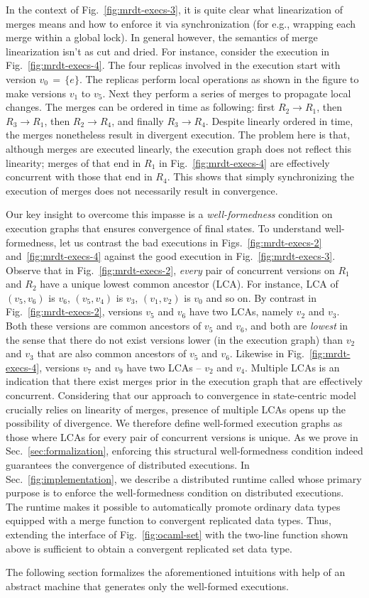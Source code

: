 In the context of Fig.~\ref{fig:mrdt-execs-3}, it is quite clear what
linearization of merges means and how to enforce it via
synchronization (for e.g., wrapping each merge within a global lock).
In general however, the semantics of merge linearization isn't as cut
and dried. For instance, consider the execution in
Fig.~\ref{fig:mrdt-execs-4}. The four replicas involved in the
execution start with version $v_0 \,=\, \{e\}$. The replicas perform
local operations as shown in the figure to make versions $v_1$ to
$v_5$. Next they perform a series of merges to propagate local
changes. The merges can be ordered in time as following: first $R_2
\rightarrow R_1$, then $R_3 \rightarrow R_1$, then $R_2 \rightarrow
R_4$, and finally $R_3 \rightarrow R_4$. Despite linearly ordered in
time, the merges nonetheless result in divergent execution. The
problem here is that, although merges are executed linearly, the
execution graph does not reflect this linearity; merges of that end in
$R_1$ in Fig.~\ref{fig:mrdt-execs-4} are effectively concurrent with
those that end in $R_4$. This shows that simply synchronizing the
execution of merges does not necessarily result in convergence.

Our key insight to overcome this impasse is a \emph{well-formedness}
condition on execution graphs that ensures convergence of final
states. To understand well-formedness, let us contrast the bad
executions in Figs.~\ref{fig:mrdt-execs-2} and~\ref{fig:mrdt-execs-4}
against the good execution in Fig.~\ref{fig:mrdt-execs-3}. Observe
that in Fig.~\ref{fig:mrdt-execs-2}, \emph{every} pair of concurrent
versions on $R_1$ and $R_2$ have a unique lowest common ancestor
(LCA). For instance, LCA of $(v_5,v_6)$ is $v_6$, $(v_5,v_4)$ is
$v_3$, $(v_1,v_2)$ is $v_0$ and so on. By contrast in
Fig.~\ref{fig:mrdt-execs-2}, versions $v_5$ and $v_6$ have two LCAs,
namely $v_2$ and $v_3$. Both these versions are common ancestors of
$v_5$ and $v_6$, and both are \emph{lowest} in the sense that there do
not exist versions lower (in the execution graph) than $v_2$ and $v_3$
that are also common ancestors of $v_5$ and $v_6$. Likewise in
Fig.~\ref{fig:mrdt-execs-4}, versions $v_7$ and $v_9$ have two LCAs --
$v_2$ and $v_4$. Multiple LCAs is an indication that there exist
merges prior in the execution graph that are effectively concurrent.
Considering that our approach to convergence in state-centric model
crucially relies on linearity of merges, presence of multiple LCAs
opens up the possibility of divergence. We therefore define
well-formed execution graphs as those where LCAs for every pair of
concurrent versions is unique. As we prove in
Sec.~\ref{sec:formalization}, enforcing this structural
well-formedness condition indeed guarantees the convergence of
distributed executions. In Sec.~\ref{fig:implementation}, we describe
a distributed runtime called \quark whose primary purpose is to
enforce the well-formedness condition on distributed executions. The
runtime makes it possible to automatically promote ordinary data types
equipped with a merge function to convergent replicated data types.
Thus, extending the  interface of Fig.~\ref{fig:ocaml-set} with
the two-line  function shown above is sufficient to
obtain a convergent replicated set data type.

The following section formalizes the aforementioned intuitions with
help of an abstract machine that generates only the well-formed
executions. 
